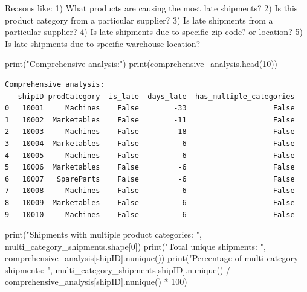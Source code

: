 \documentclass[
]{article}
\newenvironment{Shaded}{\begin{snugshade}}{\end{snugshade}}
\newcommand{\BuiltInTok}[1]{\textcolor[rgb]{0.00,0.23,0.31}{#1}}
\newcommand{\DecValTok}[1]{\textcolor[rgb]{0.68,0.00,0.00}{#1}}
\newcommand{\NormalTok}[1]{\textcolor[rgb]{0.00,0.23,0.31}{#1}}
\newcommand{\OperatorTok}[1]{\textcolor[rgb]{0.37,0.37,0.37}{#1}}
\newcommand{\StringTok}[1]{\textcolor[rgb]{0.13,0.47,0.30}{#1}}
\begin{document}
Reasons like: 1) What products are causing the most late shipments? 2)
Is this product category from a particular supplier? 3) Is late
shipments from a particular supplier? 4) Is late shipments due to
specific zip code? or location? 5) Is late shipments due to specific
warehouse location?

\label{business-question-analysis-1}
\begin{Shaded}
\begin{Highlighting}[]
\BuiltInTok{print}\NormalTok{(}\StringTok{"Comprehensive analysis:"}\NormalTok{)}
\BuiltInTok{print}\NormalTok{(comprehensive\_analysis.head(}\DecValTok{10}\NormalTok{))}
\end{Highlighting}
\end{Shaded}

\begin{verbatim}
Comprehensive analysis:
   shipID prodCategory  is_late  days_late  has_multiple_categories
0   10001     Machines    False        -33                    False
1   10002  Marketables    False        -11                    False
2   10003     Machines    False        -18                    False
3   10004  Marketables    False         -6                    False
4   10005     Machines    False         -6                    False
5   10006  Marketables    False         -6                    False
6   10007   SpareParts    False         -6                    False
7   10008     Machines    False         -6                    False
8   10009  Marketables    False         -6                    False
9   10010     Machines    False         -6                    False
\end{verbatim}

\label{business-question-analysis-2}
\begin{Shaded}
\begin{Highlighting}[]
\BuiltInTok{print}\NormalTok{(}\StringTok{"Shipments with multiple product categories: "}\NormalTok{, multi\_category\_shipments.shape[}\DecValTok{0}\NormalTok{])}
\BuiltInTok{print}\NormalTok{(}\StringTok{"Total unique shipments: "}\NormalTok{, comprehensive\_analysis[}\StringTok{\textquotesingle{}shipID\textquotesingle{}}\NormalTok{].nunique())}
\BuiltInTok{print}\NormalTok{(}\StringTok{"Percentage of multi{-}category shipments: "}\NormalTok{, multi\_category\_shipments[}\StringTok{\textquotesingle{}shipID\textquotesingle{}}\NormalTok{].nunique() }\OperatorTok{/}\NormalTok{ comprehensive\_analysis[}\StringTok{\textquotesingle{}shipID\textquotesingle{}}\NormalTok{].nunique() }\OperatorTok{*} \DecValTok{100}\NormalTok{)}
\end{Highlighting}
\end{Shaded}
\end{document}
